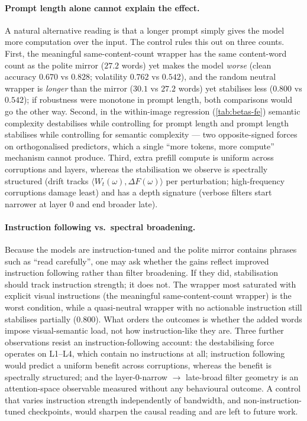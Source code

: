 \documentclass[10pt,twocolumn,letterpaper]{article}
\newcommand{\Wt}{W_t(\omega)}
\newcommand{\DF}{\Delta F(\omega)}
\begin{document}
\paragraph{Prompt length alone cannot explain the effect.} A natural alternative reading is that a longer prompt simply gives the model more computation over the input. The control rules this out on three counts. First, the meaningful same-content-count wrapper has the same content-word count as the polite mirror ($27.2$ words) yet makes the model \emph{worse} (clean accuracy $0.670$ vs $0.828$; volatility $0.762$ vs $0.542$), and the random neutral wrapper is \emph{longer} than the mirror ($30.1$ vs $27.2$ words) yet stabilises less ($0.800$ vs $0.542$); if robustness were monotone in prompt length, both comparisons would go the other way. Second, in the within-image regression (\cref{tab:betas-fe}) semantic complexity destabilises while controlling for prompt length and prompt length stabilises while controlling for semantic complexity --- two opposite-signed forces on orthogonalised predictors, which a single ``more tokens, more compute'' mechanism cannot produce. Third, extra prefill compute is uniform across corruptions and layers, whereas the stabilisation we observe is spectrally structured (drift tracks $\langle \Wt, \DF \rangle$ per perturbation; high-frequency corruptions damage least) and has a depth signature (verbose filters start narrower at layer 0 and end broader late).

\paragraph{Instruction following vs.\ spectral broadening.} Because the models are instruction-tuned and the polite mirror contains phrases such as ``read carefully'', one may ask whether the gains reflect improved instruction following rather than filter broadening. If they did, stabilisation should track instruction strength; it does not. The wrapper most saturated with explicit visual instructions (the meaningful same-content-count wrapper) is the worst condition, while a quasi-neutral wrapper with no actionable instruction still stabilises partially ($0.800$). What orders the outcomes is whether the added words impose visual-semantic load, not how instruction-like they are. Three further observations resist an instruction-following account: the destabilising force operates on L1--L4, which contain no instructions at all; instruction following would predict a uniform benefit across corruptions, whereas the benefit is spectrally structured; and the layer-0-narrow $\to$ late-broad filter geometry is an attention-space observable measured without any behavioural outcome. A control that varies instruction strength independently of bandwidth, and non-instruction-tuned checkpoints, would sharpen the causal reading and are left to future work.
\end{document}
